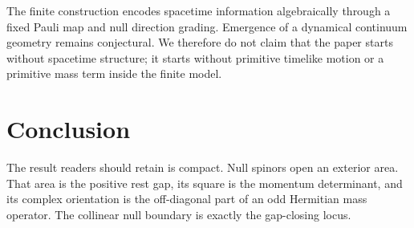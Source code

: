 \documentclass[11pt]{article}
\begin{document}
The finite construction encodes spacetime information algebraically through a
fixed Pauli map and null direction grading.  Emergence of a dynamical continuum
geometry remains conjectural.  We therefore do not claim that the paper starts
without spacetime structure; it starts without primitive timelike motion or a
primitive mass term inside the finite model.

\section{Conclusion}

The result readers should retain is compact.  Null spinors open an exterior
area.  That area is the positive rest gap, its square is the momentum
determinant, and its complex orientation is the off-diagonal part of an odd
Hermitian mass operator.  The collinear null boundary is exactly the
gap-closing locus.
\end{document}
